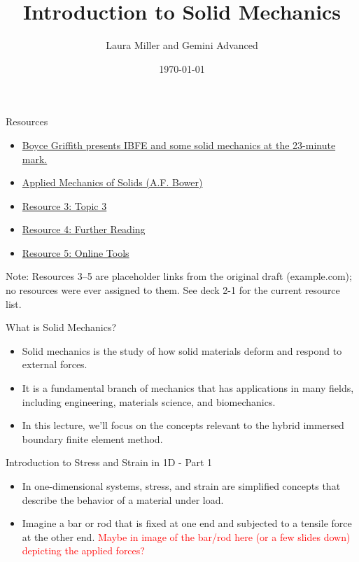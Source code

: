 \documentclass{beamer}
\title{Introduction to Solid Mechanics}
\author{Laura Miller and Gemini Advanced}
\date{\today}
\begin{document}
\frame{\titlepage}

\begin{frame}{Resources}
  \begin{itemize}
    \item \href{https://www.youtube.com/watch?v=-1TlNJL93sc}{Boyce Griffith presents IBFE and some solid mechanics at the 23-minute mark.}
    \item \href{https://solidmechanics.org/contents.php}{Applied Mechanics of Solids (A.F. Bower)}
    \item \href{https://example.com/resource3}{Resource 3: Topic 3}
    \item \href{https://example.com/resource4}{Resource 4: Further Reading}
    \item \href{https://example.com/resource5}{Resource 5: Online Tools}
  \end{itemize}
  {\footnotesize Note: Resources 3--5 are placeholder links from the original draft (example.com); no resources were ever assigned to them. See deck 2-1 for the current resource list.\par}
\end{frame}

\begin{frame}{What is Solid Mechanics?}
    \begin{itemize}
        \item Solid mechanics is the study of how solid materials deform and respond to external forces.
        \item It is a fundamental branch of mechanics that has applications in many fields, including engineering, materials science, and biomechanics.
        \item In this lecture, we'll focus on the concepts relevant to the hybrid immersed boundary finite element method.
    \end{itemize}
\end{frame}

\begin{frame}{Introduction to Stress and Strain in 1D - Part 1}
    \begin{itemize}
        \item In one-dimensional systems, stress, and strain are simplified concepts that describe the behavior of a material under load.
        \item Imagine a bar or rod that is fixed at one end and subjected to a tensile force at the other end. 
        \textcolor{red}{Maybe in image of the bar/rod here (or a few slides down) depicting the applied forces?}
    \end{itemize}
\end{frame}
\end{document}
